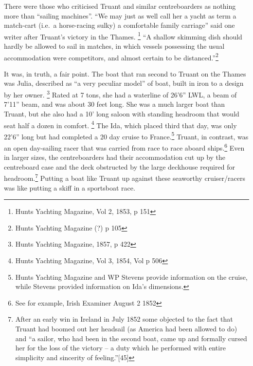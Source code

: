 \documentclass[
  letterpaper,
]{scrbook}
\begin{document}
There were those who criticised Truant and similar centreboarders as
nothing more than ``sailing machines''. ``We may just as well call her a
yacht as term a match-cart (i.e.~a horse-racing sulky) a comfortable
family carriage'' said one writer after Truant's victory in the Thames.
\footnote{Hunts Yachting Magazine, Vol 2, 1853, p 151} ``A shallow
skimming dish should hardly be allowed to sail in matches, in which
vessels possessing the usual accommodation were competitors, and almost
certain to be distanced.''\footnote{Hunts Yachting Magazine (?) p 105}

It was, in truth, a fair point. The boat that ran second to Truant on
the Thames was Julia, described as ``a very peculiar model'' of boat,
built in iron to a design by her owner. \footnote{Hunts Yachting
  Magazine, 1857, p 422} Rated at 7 tons, she had a waterline of 26'6''
LWL, a beam of 7'11'' beam, and was about 30 feet long. She was a much
larger boat than Truant, but she also had a 10' long saloon with
standing headroom that would seat half a dozen in comfort. \footnote{Hunts
  Yachting Magazine, Vol 3, 1854, Vol p 506} The Ida, which placed third
that day, was only 22'6'' long but had completed a 20 day cruise to
France.\footnote{Hunts Yachting Magazine and WP Stevens provide
  information on the cruise, while Stevens provided information on Ida's
  dimensions.} Truant, in contrast, was an open day-sailing racer that
was carried from race to race aboard ships.\footnote{See for example,
  Irish Examiner August 2 1852} Even in larger sizes, the centreboarders
had their accommodation cut up by the centreboard case and the deck
obstructed by the large deckhouse required for headroom.\footnote{After
  an early win in Ireland in July 1852 some objected to the fact that
  Truant had boomed out her headsail (as America had been allowed to do)
  and ``a sailor, who had been in the second boat, came up and formally
  cursed her for the loss of the victory -- a duty which he performed
  with entire simplicity and sincerity of feeling.''{[}45{]}} Putting a
boat like Truant up against these seaworthy cruiser/racers was like
putting a skiff in a sportsboat race.
\end{document}
